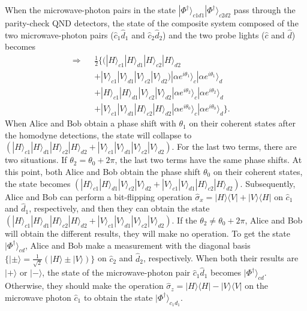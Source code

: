\documentclass[showpacs,aps,graphicx,twocolumn]{revtex4}
\begin{document}
When the microwave-photon pairs in the state
$|\Phi^{\dag}\rangle_{c1d1}|\Phi^{\dag}\rangle_{c2d2}$ pass through
the parity-check QND detectors, the state of the composite system
composed of the two microwave-photon pairs ($\hat{c}_1\hat{d}_1$ and
$\hat{c}_2\hat{d}_2$) and the two probe lights ($\hat{c}$ and
$\hat{d}$) becomes
\begin{eqnarray}\label{eqnoerror}
\Longrightarrow\!\!\!\!&&\frac{1}{2}\{(|H\rangle_{c1}|H\rangle_{d1}
|H\rangle_{c2}|H\rangle_{d2}\nonumber\\
&&+|V\rangle_{c1}|V\rangle_{d1}|V\rangle_{c2}|V\rangle_{d2})
|\alpha e^{i\theta_{1}}\rangle_{c}|\alpha e^{i\theta_{1}}\rangle_{d}\nonumber\\
&&+|H\rangle_{c1}|H\rangle_{d1}|V\rangle_{c2}|V\rangle_{d2}
|\alpha e^{i\theta_{2}}\rangle_{c}|\alpha e^{i\theta_{2}}\rangle_{d}\nonumber\\
&&+|V\rangle_{c1}|V\rangle_{d1}|H\rangle_{c2}|H\rangle_{d2} |\alpha
e^{i\theta_{0}}\rangle_{c}|\alpha e^{i\theta_{0}}\rangle_{d}\}.\;\;\;\;
\end{eqnarray}
When Alice and Bob obtain a phase shift with $\theta_{1}$ on their
coherent states after the homodyne detections, the state will
collapse to
$(|H\rangle_{c1}|H\rangle_{d1}|H\rangle_{c2}|H\rangle_{d2}
+|V\rangle_{c1}|V\rangle_{d1}|V\rangle_{c2}|V\rangle_{d2})$. For the
last two terms, there are two situations. If
$\theta_{2}\!=\!\theta_{0}\!+\!2\pi$, the last two terms have the
same phase shifts. At this point, both Alice and Bob obtain the
phase shift $\theta_{0}$ on their coherent states, the state becomes
$(|H\rangle_{c1}|H\rangle_{d1}|V\rangle_{c2}|V\rangle_{d2}
+|V\rangle_{c1}|V\rangle_{d1}|H\rangle_{c2}|H\rangle_{d2})$.
Subsequently, Alice and Bob can perform a bit-flipping operation
$\hat{\sigma}_{x}=|H\rangle\langle V|+|V\rangle\langle H|$ on
$\hat{c}_{1}$ and $\hat{d}_{1}$, respectively, and then they can
obtain the state
$(|H\rangle_{c1}|H\rangle_{d1}|H\rangle_{c2}|H\rangle_{d2}
+|V\rangle_{c1}|V\rangle_{d1}|V\rangle_{c2}|V\rangle_{d2})$. If the
$\theta_{2}\neq\theta_{0}+2\pi$, Alice and Bob will obtain the
different results, they will make no operation.  To get the
state $|\Phi^{\dag}\rangle_{cd}$, Alice and Bob make a measurement
with the diagonal basis
$\{|\pm\rangle=\frac{1}{\sqrt{2}}(|H\rangle\pm|V\rangle)\}$ on
$\hat{c}_{2}$ and $\hat{d}_{2}$, respectively. When both their
results are $|+\rangle$ or $|-\rangle$, the state of the
microwave-photon pair $\hat{c}_{1}\hat{d}_{1}$ becomes
$|\Phi^{\dag}\rangle_{cd}$. Otherwise, they should make the
operation $\hat{\sigma}_{z}=|H\rangle\langle H|-|V\rangle\langle V|$
on the microwave photon $\hat{c}_{1}$ to obtain the state
$|\Phi^{\dag}\rangle_{c_1d_1}$.
\end{document}
